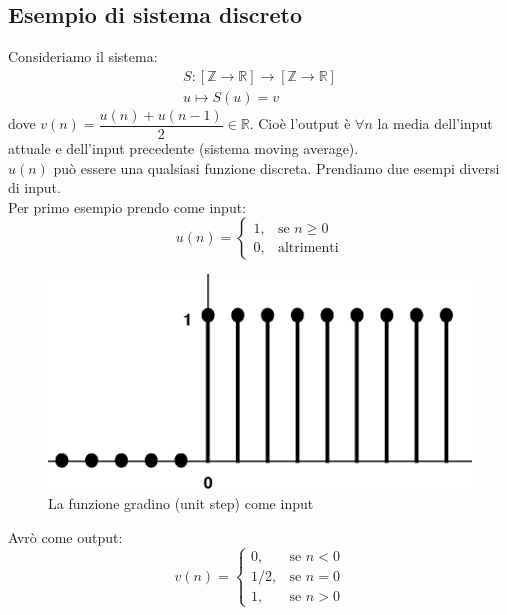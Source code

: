 \subsection*{Esempio di sistema discreto}
Consideriamo il sistema: \\
\begin{equation*}
	\begin{split}
	S: [\mathbb{Z} \rightarrow \mathbb{R}] \rightarrow [\mathbb{Z} \rightarrow \mathbb{R}] \\
	u \mapsto S(u) = v
	\end{split}
\end{equation*}
dove $v(n) = \dfrac{u(n)+u(n-1)}{2} \in \mathbb{R} $. Cioè l'output è $\forall n $ la media dell'input attuale e dell'input precedente (sistema moving average).\\
$u(n)$ può essere una qualsiasi funzione discreta. Prendiamo due esempi diversi di input.\\


Per primo esempio prendo come input:
\begin{equation*}
u(n)=
\begin{cases} 
	1, & \mbox{se }n\geq 0 \\ 
	0, & \mbox{altrimenti}
\end{cases} 
\end{equation*}

\begin{figure}[h]
	\centering
	\includegraphics[scale=0.5]{immagini/gradino}
	\caption{ La funzione gradino (unit step) come input }
	\label{fig: Unit step}
\end{figure}

\pagebreak

Avrò come output:
\begin{equation*}
v(n)=
\begin{cases} 
0, & \mbox{se }n < 0 \\ 
1/2, & \mbox{se }n = 0 \\ 
1, & \mbox{se }n > 0
\end{cases} 
\end{equation*}

